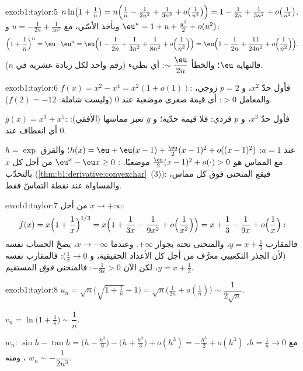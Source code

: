 \begin{solution}{exo:b1:taylor:5}
$n\ln\bigl(1 + \frac1n\bigr) = n\Bigl(\frac1n - \frac{1}{2n^2} +
\frac{1}{3n^3} + o\bigl(\frac{1}{n^3}\bigr)\Bigr) = 1 - \frac{1}{2n}
+ \frac{1}{3n^2} + o\bigl(\frac{1}{n^2}\bigr)$. وبأخذ الأسّي، مع
$u = -\frac{1}{2n} + \frac{1}{3n^2}$ و $\eu^u = 1 + u + \frac{u^2}2
+ o(u^2)$:
\[
\Bigl(1 + \frac1n\Bigr)^n = \eu\cdot \eu^{u}
= \eu\Bigl(1 - \frac{1}{2n} + \frac{1}{3n^2} + \frac{1}{8n^2}
+ o\Bigl(\frac{1}{n^2}\Bigr)\Bigr)
= \eu\Bigl(1 - \frac{1}{2n} + \frac{11}{24n^2} +
o\Bigl(\frac{1}{n^2}\Bigr)\Bigr).
\]
فالنهاية $\eu$؛ والخطأ $\sim \dfrac{\eu}{2n}$: أي بطيء (رقم واحد لكل
زيادة عشرية في $n$).
\end{solution}

\begin{solution}{exo:b1:taylor:6}
$f(x) = x^2 - x^4 = x^2(1 + o(1))$: فأول حدّ $x^2$، و $p = 2$ زوجي،
والمعامل $> 0$: أي قيمة صغرى موضعية عند $0$ (وليست شاملة: $f(2) = -12$).

$g(x) = x^3 + x^5$: فأول حدّ $x^3$، و $p$ فردي: فلا قيمة حدّية؛ و $g$
تعبر مماسها (الأفقي): أي انعطاف عند $0$.

$h = \exp$ عند $a = 1$: $h(x) = \eu + \eu(x-1) + \frac{\eu}{2}(x-1)^2
+ o((x-1)^2)$؛ والفرق مع المماس هو
$\frac{\eu}{2}(x-1)^2 + o(\cdot) > 0$ موضعيًا. : $\eu^x -
\eu x \geq 0$ من أجل كل $x$ بالتحدّب
(\cref{thm:b1:derivative:convexchar}~(3)): فيقع المنحنى فوق كل
مماس، والمساواة عند نقطة التماسّ فقط.
\end{solution}

\begin{solution}{exo:b1:taylor:7}
من أجل $x \to +\infty$:
\[
f(x) = x\Bigl(1 + \frac1x\Bigr)^{1/3}
= x\Bigl(1 + \frac{1}{3x} - \frac{1}{9x^2} +
o\Bigl(\frac{1}{x^2}\Bigr)\Bigr)
= x + \frac13 - \frac{1}{9x} + o\Bigl(\frac1x\Bigr):
\]
فالمقارب $y = x + \frac13$، والمنحنى تحته بجوار $+\infty$. وعندما $x
\to -\infty$، يصحّ الحساب نفسه (لأن الجذر التكعيبي
معرَّف من أجل كل الأعداد الحقيقية، و $\frac1x \to 0$): فالمقارب نفسه $y = x +
\frac13$، لكن الآن $-\frac{1}{9x} > 0$: فالمنحنى \emph{فوق} المستقيم.
\end{solution}

\begin{solution}{exo:b1:taylor:8}
$u_n = \sqrt n\bigl(\sqrt{1 + \tfrac1n} - 1\bigr) = \sqrt
n\bigl(\frac{1}{2n} + o(\frac1n)\bigr) \sim \dfrac{1}{2\sqrt n}$.

$v_n = \ln\bigl(1 + \frac1n\bigr) \sim \dfrac 1n$.

$w_n$: مع $h = \frac1n \to 0$، $\sin h - \tan h = \bigl(h -
\frac{h^3}{6}\bigr) - \bigl(h + \frac{h^3}{3}\bigr) + o(h^3) =
-\frac{h^3}{2} + o(h^3)$، ومنه $w_n \sim -\dfrac{1}{2n^3}$.
\end{solution}

